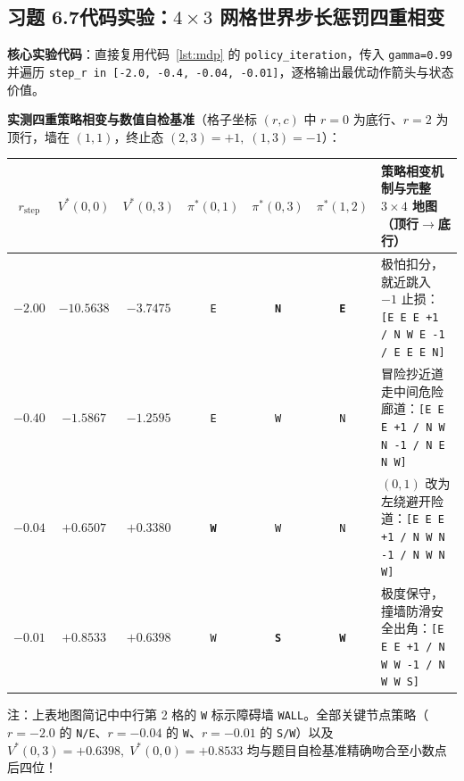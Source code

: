 \subsection*{习题 6.7\quad 代码实验：$4\times 3$ 网格世界步长惩罚四重相变}
\textbf{核心实验代码}：直接复用代码~\ref{lst:mdp} 的 \texttt{policy\_iteration}，传入 \texttt{gamma=0.99} 并遍历 \texttt{step\_r in [-2.0, -0.4, -0.04, -0.01]}，逐格输出最优动作箭头与状态价值。

\textbf{实测四重策略相变与数值自检基准}（格子坐标 $(r, c)$ 中 $r=0$ 为底行、$r=2$ 为顶行，墙在 $(1,1)$，终止态 $(2,3)=+1,\; (1,3)=-1$）：
\begin{center}
\footnotesize
\begin{tabularx}{\linewidth}{@{}c c c c c c X@{}}
\toprule
$r_{\text{step}}$ & $V^*(0,0)$ & $V^*(0,3)$ & $\pi^*(0,1)$ & $\pi^*(0,3)$ & $\pi^*(1,2)$ & \textbf{策略相变机制与完整 $3\times 4$ 地图（顶行$\to$底行）} \\
\midrule
$-2.00$ & $-10.5638$ & $-3.7475$ & \texttt{E} & \textbf{\texttt{N}} & \textbf{\texttt{E}} & 极怕扣分，就近跳入 $-1$ 止损：\texttt{[E E E +1 / N W E -1 / E E E N]} \\
$-0.40$ & $-1.5867$ & $-1.2595$ & \texttt{E} & \texttt{W} & \texttt{N} & 冒险抄近道走中间危险廊道：\texttt{[E E E +1 / N W N -1 / N E N W]} \\
$-0.04$ & $+0.6507$ & $+0.3380$ & \textbf{\texttt{W}} & \texttt{W} & \texttt{N} & $(0,1)$ 改为左绕避开险道：\texttt{[E E E +1 / N W N -1 / N W N W]} \\
$-0.01$ & $\mathbf{+0.8533}$ & $\mathbf{+0.6398}$ & \texttt{W} & \textbf{\texttt{S}} & \textbf{\texttt{W}} & 极度保守，撞墙防滑安全出角：\texttt{[E E E +1 / N W W -1 / N W W S]} \\
\bottomrule
\end{tabularx}
\end{center}
注：上表地图简记中中行第 2 格的 \texttt{W} 标示障碍墙 \texttt{WALL}。全部关键节点策略（$r=-2.0$ 的 \texttt{N/E}、$r=-0.04$ 的 \texttt{W}、$r=-0.01$ 的 \texttt{S/W}）以及 $V^*(0,3)=+0.6398,\; V^*(0,0)=+0.8533$ 均与题目自检基准精确吻合至小数点后四位！

